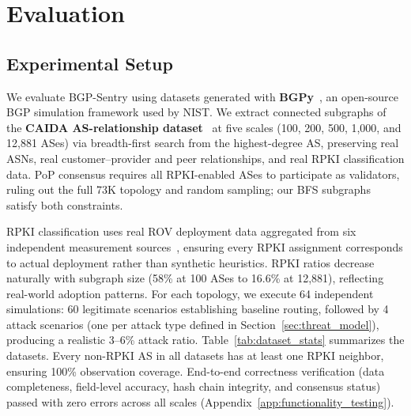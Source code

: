 

\section{Evaluation}

  \subsection{Experimental Setup}
  \label{sec:dataset}

  We evaluate BGP-Sentry using datasets generated with \textbf{BGPy}~\cite{furuness2024bgpy}, an open-source BGP simulation framework used by NIST. We extract connected subgraphs of the \textbf{CAIDA AS-relationship dataset}~\cite{caida-dataset} at five scales (100, 200, 500, 1{,}000, and 12{,}881 ASes) via breadth-first search from the highest-degree AS, preserving real ASNs, real customer--provider and peer relationships, and real RPKI classification data. PoP consensus requires all RPKI-enabled ASes to participate as validators, ruling out the full 73K topology and random sampling; our BFS subgraphs satisfy both constraints.

  RPKI classification uses real ROV deployment data aggregated from six independent measurement sources~\cite{li2023rovista}, ensuring every RPKI assignment corresponds to actual deployment rather than synthetic heuristics. RPKI ratios decrease naturally with subgraph size (58\% at 100 ASes to 16.6\% at 12{,}881), reflecting real-world adoption patterns. For each topology, we execute 64 independent simulations: 60 legitimate scenarios establishing baseline routing, followed by 4 attack scenarios (one per attack type defined in Section~\ref{sec:threat_model}), producing a realistic 3--6\% attack ratio. Table~\ref{tab:dataset_stats} summarizes the datasets. Every non-RPKI AS in all datasets has at least one RPKI neighbor, ensuring 100\% observation coverage. End-to-end correctness verification (data completeness, field-level accuracy, hash chain integrity, and consensus status) passed with zero errors across all scales (Appendix~\ref{app:functionality_testing}).

